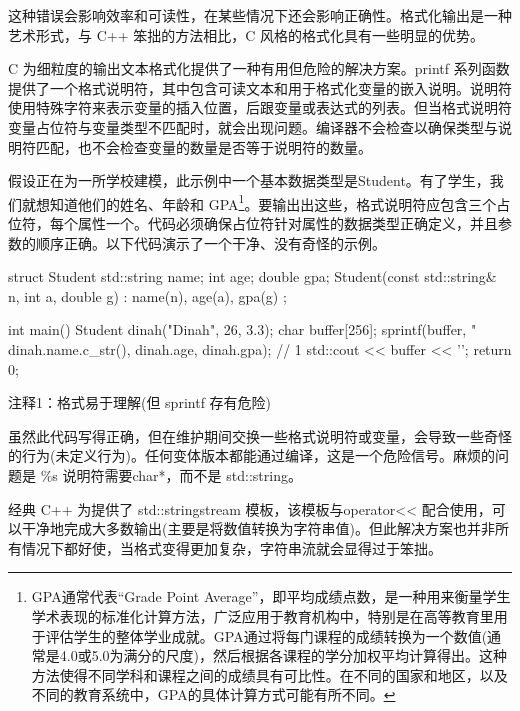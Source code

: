 这种错误会影响效率和可读性，在某些情况下还会影响正确性。格式化输出是一种艺术形式，与 C++ 笨拙的方法相比，C 风格的格式化具有一些明显的优势。


C 为细粒度的输出文本格式化提供了一种有用但危险的解决方案。printf 系列函数提供了一个格式说明符，其中包含可读文本和用于格式化变量的嵌入说明。说明符使用特殊字符来表示变量的插入位置，后跟变量或表达式的列表。但当格式说明符变量占位符与变量类型不匹配时，就会出现问题。编译器不会检查以确保类型与说明符匹配，也不会检查变量的数量是否等于说明符的数量。

假设正在为一所学校建模，此示例中一个基本数据类型是Student。有了学生，我们就想知道他们的姓名、年龄和 GPA\footnote{GPA通常代表“Grade Point Average”，即平均成绩点数，是一种用来衡量学生学术表现的标准化计算方法，广泛应用于教育机构中，特别是在高等教育里用于评估学生的整体学业成就。GPA通过将每门课程的成绩转换为一个数值(通常是4.0或5.0为满分的尺度)，然后根据各课程的学分加权平均计算得出。这种方法使得不同学科和课程之间的成绩具有可比性。在不同的国家和地区，以及不同的教育系统中，GPA的具体计算方式可能有所不同。}。要输出出这些，格式说明符应包含三个占位符，每个属性一个。代码必须确保占位符针对属性的数据类型正确定义，并且参数的顺序正确。以下代码演示了一个干净、没有奇怪的示例。


\begin{cpp}
struct Student {
  std::string name;
  int age;
  double gpa;
  Student(const std::string& n, int a, double g) : name(n), age(a), gpa(g) {}
};

int main() {
  Student dinah("Dinah", 26, 3.3);
  char buffer[256];
  sprintf(buffer, "%
    dinah.name.c_str(), dinah.age, dinah.gpa); // 1
  std::cout << buffer << '\n';
  return 0;
}
\end{cpp}

{\footnotesize
注释1：格式易于理解(但 sprintf 存有危险)
}


虽然此代码写得正确，但在维护期间交换一些格式说明符或变量，会导致一些奇怪的行为(未定义行为)。任何变体版本都能通过编译，这是一个危险信号。麻烦的问题是 \%s 说明符需要char*，而不是 std::string。

经典 C++ 为提供了 std::stringstream 模板，该模板与operator<{}< 配合使用，可以干净地完成大多数输出(主要是将数值转换为字符串值)。但此解决方案也并非所有情况下都好使，当格式变得更加复杂，字符串流就会显得过于笨拙。

